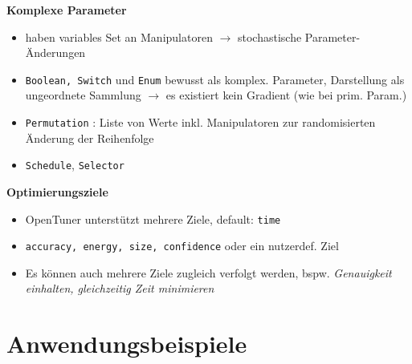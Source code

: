   \begin{frame}
    \textbf{Komplexe Parameter}
    \begin{itemize}
      \item haben variables Set an Manipulatoren $\rightarrow$ stochastische Parameter-Änderungen
      \item \texttt{Boolean, Switch} und \texttt{Enum} bewusst als komplex. Parameter, Darstellung
      als ungeordnete Sammlung $\rightarrow$ es existiert kein Gradient (wie bei prim. Param.)
      \item \texttt{Permutation} : Liste von Werte inkl. Manipulatoren zur randomisierten Änderung der Reihenfolge
      \item \texttt{Schedule}, \texttt{Selector}
      
    \end{itemize}
  
  \textbf{Optimierungsziele}
    \begin{itemize}
      \item OpenTuner unterstützt mehrere Ziele, default: \texttt{time}
      \item \texttt{accuracy, energy, size, confidence} oder ein nutzerdef. Ziel
      \item Es können auch mehrere Ziele zugleich verfolgt werden, bspw. \emph{Genauigkeit einhalten, gleichzeitig
      Zeit minimieren}
    \end{itemize}
  \end{frame}
    
    \section{Anwendungsbeispiele}
    
